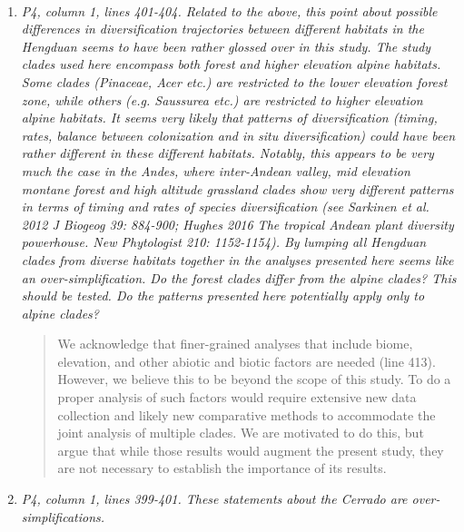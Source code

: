 \documentclass[11pt]{letter}
\begin{document}
\begin{letter}{ \\

}
\begin{enumerate}
  \begin{quote}
    Thank you for this insight, which we have added to the Discussion
    (line 417). If the reviewer were willing to shed anonymity we
    would be happy to cite this particular point as a personal
    communication (in addition to a more general acknowledgement).
  \end{quote}

\item \textit{P4, column 1, lines 401-404. Related to the above, this
    point about possible differences in diversification trajectories
    between different habitats in the Hengduan seems to have been
    rather glossed over in this study. The study clades used here
    encompass both forest and higher elevation alpine habitats. Some
    clades (Pinaceae, Acer etc.)  are restricted to the lower
    elevation forest zone, while others (e.g. Saussurea etc.) are
    restricted to higher elevation alpine habitats. It seems very
    likely that patterns of diversification (timing, rates, balance
    between colonization and in situ diversification) could have been
    rather different in these different habitats.  Notably, this
    appears to be very much the case in the Andes, where inter-Andean
    valley, mid elevation montane forest and high altitude grassland
    clades show very different patterns in terms of timing and rates
    of species diversification (see Sarkinen et al. 2012 J Biogeog 39:
    884-900; Hughes 2016 The tropical Andean plant diversity
    powerhouse. New Phytologist 210: 1152-1154). By lumping all
    Hengduan clades from diverse habitats together in the analyses
    presented here seems like an over-simplification. Do the forest
    clades differ from the alpine clades? This should be tested. Do
    the patterns presented here potentially apply only to alpine
    clades?}

  \begin{quote}
    We acknowledge that finer-grained analyses that include biome,
    elevation, and other abiotic and biotic factors are needed (line
    413). However, we believe this to be beyond the scope of this
    study. To do a proper analysis of such factors would require
    extensive new data collection and likely new comparative methods
    to accommodate the joint analysis of multiple clades. We are
    motivated to do this, but argue that while those results would
    augment the present study, they are not necessary to establish the
    importance of its results.
  \end{quote}
\item \textit{P4, column 1, lines 399-401. These statements about the
    Cerrado are over-simplifications.}


\end{enumerate}
\end{letter}
\end{document}

